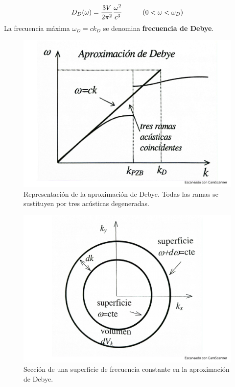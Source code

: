 \begin{equation}
	D_D (\omega) = \frac{3V}{2\pi^2} \frac{\omega^2}{c^3} \quad \quad \quad (0<\omega<\omega_D)
    \label{Ec:05-01-07}
\end{equation}
La frecuencia máxima $\omega_D=ck_D$ se denomina \textbf{frecuencia de Debye}. 


\begin{figure}[h!] \centering
    \includegraphics[scale=0.35]{Cuerpo/Ch_05/Fotos libro 2.pdf}
    \caption{Representación de la aproximación de Debye. Todas las ramas se sustituyen por tres acústicas degeneradas.}
    \label{Fig:05-02}
\end{figure}



\begin{figure}[h!] \centering
    \includegraphics[scale=0.35]{Cuerpo/Ch_05/Fotos libro 3.pdf}
    \caption{Sección de una superficie de frecuencia constante en la aproximación de Debye.}
    \label{Fig:05-03}
\end{figure}    

